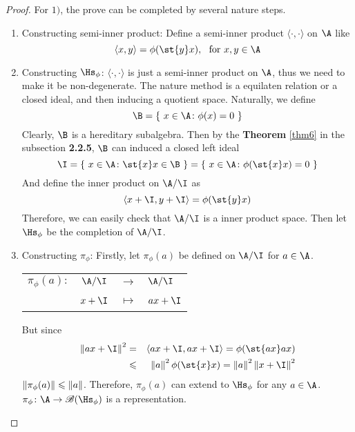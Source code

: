 \begin{proof}
	For $1)$, the prove can be completed by several nature steps.
	\begin{enumerate}[label=\arabic*)]
		\item Constructing semi-inner product: Define a semi-inner product $\langle \cdot, \cdot \rangle$ on $\A$ like
		\begin{equation*}
			\langle x,y \rangle = \phi(\st{y}x),~~ \text{for}~ x,y \in \A
		\end{equation*}
		\item Constructing $\Hs_{\phi}$: $\langle \cdot, \cdot \rangle$ is just a semi-inner product on $\A$, thus we need to make it be non-degenerate. The nature method is a equilaten relation or a closed ideal, and then inducing a quotient space. Naturally, we define
		\begin{equation*}
			\B = \{~x \in \A \colon \phi(x) = 0~\}
		\end{equation*}
		Clearly, $\B$ is a hereditary subalgebra. Then by the \textbf{Theorem} \ref{thm6} in the subsection \textbf{2.2.5}, $\B$ can induced a closed left ideal
		\begin{equation*}
			\I = \{~x \in \A \colon \st{x}x \in \B~\} = \{~x \in \A \colon \phi(\st{x}x) = 0~\}
		\end{equation*}
		And define the inner product on $\A / \I$ as
		\begin{equation*}
			\langle x+\I,y+\I \rangle = \phi(\st{y}x)
		\end{equation*}
		Therefore, we can easily check that $\A / \I$ is a inner product space. Then let $\Hs_{\phi}$ be the completion of $\A / \I$.
		\item Constructing $\pi_{\phi}$: Firstly, let $\pi_{\phi}(a)$ be defined on $\A / \I$ for $a \in \A$.
		\begin{center}
		\begin{tabular}{l c c l}
			$\pi_{\phi}(a) \colon$ & $\A / \I$ & $\longrightarrow$ & $\A / \I$ \\
			~ & $x+\I$ & $\longmapsto$ & $ax+\I$
		\end{tabular}
		\end{center}
		But since
		\begin{eqnarray*}
			\norm{ax+\I}^2 &=& \langle ax+\I,ax+\I \rangle = \phi(\st{ax}ax) \\
		 	&\leqslant& \norm{a}^2 \phi(\st{x}x) = \norm{a}^2\norm{x+\I}^2
		\end{eqnarray*}
		$\left\lVert\pi_{\phi}(a)\right\lVert \leqslant \left\lVert a\right\lVert$. Therefore, $\pi_{\phi}(a)$ can extend to $\Hs_{\phi}$ for any $a \in \A$. $\pi_{\phi} \colon \A \sto \fml{B}(\Hs_{\phi})$ is a representation.

\end{enumerate}
\end{proof}

